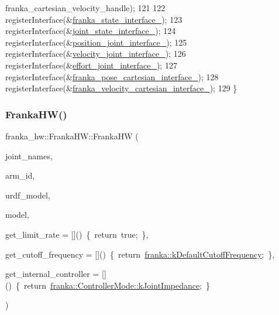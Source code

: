 \begin{DoxyCode}
      franka\_cartesian\_velocity\_handle);
121 
122   registerInterface(&\hyperlink{classfranka__hw_1_1FrankaHW_ac14c76285bdd23c99a2dc60b09c862cc}{franka\_state\_interface\_});
123   registerInterface(&\hyperlink{classfranka__hw_1_1FrankaHW_a71a3f8c221792e3d833ac3d50e61a8fc}{joint\_state\_interface\_});
124   registerInterface(&\hyperlink{classfranka__hw_1_1FrankaHW_aed81f869c0785e8257c9b21ce3a54f48}{position\_joint\_interface\_});
125   registerInterface(&\hyperlink{classfranka__hw_1_1FrankaHW_aae00e8f592019644703aaebcc8b6d8db}{velocity\_joint\_interface\_});
126   registerInterface(&\hyperlink{classfranka__hw_1_1FrankaHW_a5f695d0eb767c02397372cb5536db00c}{effort\_joint\_interface\_});
127   registerInterface(&\hyperlink{classfranka__hw_1_1FrankaHW_ad64e463f182494a979b27f03fd1ecaee}{franka\_pose\_cartesian\_interface\_});
128   registerInterface(&\hyperlink{classfranka__hw_1_1FrankaHW_a4844a25f394fcd8f382d1af741dc32e8}{franka\_velocity\_cartesian\_interface\_});
129 \}
\end{DoxyCode}
\mbox{\label{classfranka__hw_1_1FrankaHW_a09c1a04fa14f9b7800d18d20afd58c78}} 
\subsubsection{\texorpdfstring{Franka\+H\+W()}{FrankaHW()}\hspace{0.1cm}{\footnotesize\ttfamily [3/3]}}
{\footnotesize\ttfamily franka\+\_\+hw\+::\+Franka\+H\+W\+::\+Franka\+HW (\begin{DoxyParamCaption}\item[{const std\+::array$<$ std\+::string, 7 $>$ \&}]{joint\+\_\+names,  }\item[{const std\+::string \&}]{arm\+\_\+id,  }\item[{const urdf\+::\+Model \&}]{urdf\+\_\+model,  }\item[{\hyperlink{classfranka_1_1Model}{franka\+::\+Model} \&}]{model,  }\item[{std\+::function$<$ \hyperlink{classbool}{bool}()$>$}]{get\+\_\+limit\+\_\+rate = {\ttfamily \mbox{[}\mbox{]}()~\{~return~true;~\}},  }\item[{std\+::function$<$ double()$>$}]{get\+\_\+cutoff\+\_\+frequency = {\ttfamily \mbox{[}\mbox{]}()~\{~return~\hyperlink{namespacefranka_ad8e3b7da346e03181ab5ac138a4171d4}{franka\+::k\+Default\+Cutoff\+Frequency};~\}},  }\item[{std\+::function$<$ \hyperlink{namespacefranka_a3e20bc77587e2c0c53598753e3f4816b}{franka\+::\+Controller\+Mode}()$>$}]{get\+\_\+internal\+\_\+controller = {\ttfamily \mbox{[}\mbox{]}()~\{~return~\hyperlink{namespacefranka_a3e20bc77587e2c0c53598753e3f4816baa7cd8fc7552b5b9c50684e57f032d724}{franka\+::\+Controller\+Mode\+::k\+Joint\+Impedance};~\}} }\end{DoxyParamCaption})}

